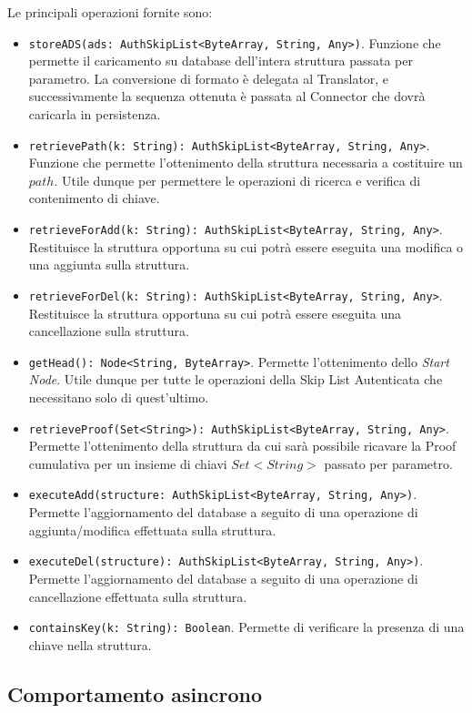 		Le principali operazioni fornite sono:
			\begin{itemize}
			\item \verb!storeADS(ads: AuthSkipList<ByteArray, String, Any>)!. Funzione che permette il caricamento su database dell'intera struttura passata per parametro. La conversione di formato è delegata al Translator, e successivamente la sequenza ottenuta è passata al Connector che dovrà caricarla in persistenza.
			\item \verb!retrievePath(k: String): AuthSkipList<ByteArray, String, Any>!. Funzione che permette l'ottenimento della struttura necessaria a costituire un $ path $. Utile dunque per permettere le operazioni di ricerca e verifica di contenimento di chiave.
			\item \verb!retrieveForAdd(k: String): AuthSkipList<ByteArray, String, Any>!. Restituisce la struttura opportuna su cui potrà essere eseguita una modifica o una aggiunta sulla struttura.
			\item \verb!retrieveForDel(k: String): AuthSkipList<ByteArray, String, Any>!. Restituisce la struttura opportuna su cui potrà essere eseguita una cancellazione sulla struttura.
			\item \verb!getHead(): Node<String, ByteArray>!. Permette l'ottenimento dello \textit{Start Node}. Utile dunque per tutte le operazioni della Skip List Autenticata che necessitano solo di quest'ultimo.
			\item \verb!retrieveProof(Set<String>): AuthSkipList<ByteArray, String, Any>!. Permette l'ottenimento della struttura da cui sarà possibile ricavare la Proof cumulativa per un insieme di chiavi $ Set<String> $ passato per parametro.
			\item \verb!executeAdd(structure: AuthSkipList<ByteArray, String, Any>)!. Permette l'aggiornamento del database a seguito di una operazione di aggiunta/modifica effettuata sulla struttura.
			\item \verb!executeDel(structure): AuthSkipList<ByteArray, String, Any>)!. Permette l'aggiornamento del database a seguito di una operazione di cancellazione effettuata sulla struttura.		
			\item \verb!containsKey(k: String): Boolean!. Permette di verificare la presenza di una chiave nella struttura.
		\end{itemize}
		
	\subsection{Comportamento asincrono}
	
